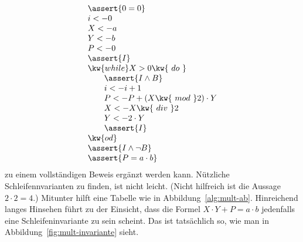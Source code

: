 \begin{align*}
  & \assert{0=0} \\[-1mm]
  & i <- 0 \\[-1mm]
  & X <- a \\[-1mm]
  & Y <- b \\[-1mm]
  & P <- 0 \\[-1mm]
  & \assert{I} \\[-1mm] %
  & \kw{while } X>0 \kw{\ do\ } \\[-1mm]
  & \qquad \assert{I \land B} \\[-1mm]
  & \qquad i <- i+1 \\[-1mm]
  & \qquad P <- P + (X \kw{\ mod\ } 2) \cdot Y \\[-1mm]
  & \qquad X <- X \kw{\ div\ } 2 \\[-1mm]
  & \qquad Y <- 2\cdot Y \\[-1mm]
  & \qquad \assert{I} \\[-1mm]
  & \kw{od} \\[-1mm]
  & \assert{I \land \lnot B} \\[-1mm]
  & \assert{P=a\cdot b}
\end{align*}
%
zu einem vollständigen Beweis ergänzt werden kann.
%
Nützliche Schleifennvarianten zu finden, ist nicht leicht.
%
(Nicht hilfreich ist \zB die Aussage $2\cdot 2 = 4$.)
%
Mitunter hilft eine Tabelle wie in Abbildung~\ref{alg:mult-ab}.
%
Hinreichend langes Hinsehen führt zu der Einsicht, dass die Formel
$X\cdot Y + P = a\cdot b$ jedenfalls eine Schleifeninvariante zu sein
scheint.
%
Das ist tatsächlich so, wie man in Abbildung~\ref{fig:mult-invariante}
sieht.
%
